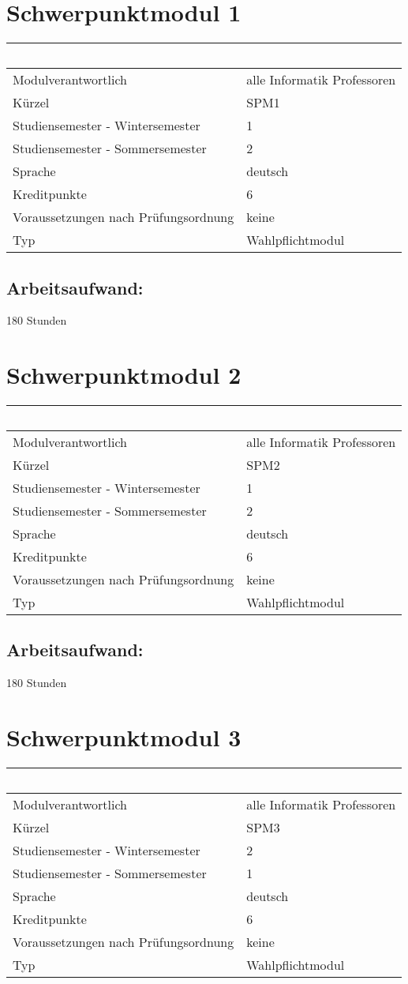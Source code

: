 \chapter{Schwerpunktmodul 1}\label{schwerpunktmodul-1}

\begin{longtable}[]{@{}ll@{}}
\toprule
~ & ~\tabularnewline
\midrule
\endhead
Modulverantwortlich & alle Informatik Professoren\tabularnewline
Kürzel & SPM1\tabularnewline
Studiensemester - Wintersemester & 1\tabularnewline
Studiensemester - Sommersemester & 2\tabularnewline
Sprache & deutsch\tabularnewline
Kreditpunkte & 6\tabularnewline
Voraussetzungen nach Prüfungsordnung & keine\tabularnewline
Typ & Wahlpflichtmodul\tabularnewline
\bottomrule
\end{longtable}

\section*{Arbeitsaufwand:}\label{arbeitsaufwand-3}

180 Stunden

\chapter{Schwerpunktmodul 2}\label{schwerpunktmodul-2}

\begin{longtable}[]{@{}ll@{}}
\toprule
~ & ~\tabularnewline
\midrule
\endhead
Modulverantwortlich & alle Informatik Professoren\tabularnewline
Kürzel & SPM2\tabularnewline
Studiensemester - Wintersemester & 1\tabularnewline
Studiensemester - Sommersemester & 2\tabularnewline
Sprache & deutsch\tabularnewline
Kreditpunkte & 6\tabularnewline
Voraussetzungen nach Prüfungsordnung & keine\tabularnewline
Typ & Wahlpflichtmodul\tabularnewline
\bottomrule
\end{longtable}

\section*{Arbeitsaufwand:}\label{arbeitsaufwand-4}

180 Stunden

\chapter{Schwerpunktmodul 3}\label{schwerpunktmodul-3}

\begin{longtable}[]{@{}ll@{}}
\toprule
~ & ~\tabularnewline
\midrule
\endhead
Modulverantwortlich & alle Informatik Professoren\tabularnewline
Kürzel & SPM3\tabularnewline
Studiensemester - Wintersemester & 2\tabularnewline
Studiensemester - Sommersemester & 1\tabularnewline
Sprache & deutsch\tabularnewline
Kreditpunkte & 6\tabularnewline
Voraussetzungen nach Prüfungsordnung & keine\tabularnewline
Typ & Wahlpflichtmodul\tabularnewline
\bottomrule
\end{longtable}

